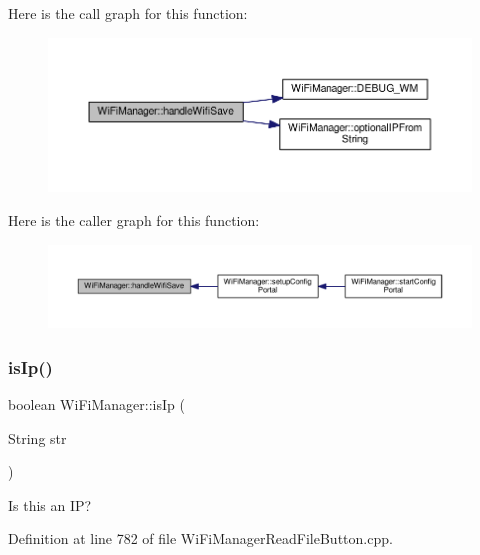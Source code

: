 Here is the call graph for this function\+:\nopagebreak
\begin{figure}[H]
\begin{center}
\leavevmode
\includegraphics[width=350pt]{d4/dc8/class_wi_fi_manager_a2a8c2b60aa86dfdeab8a1a90f7122dc7_cgraph}
\end{center}
\end{figure}
Here is the caller graph for this function\+:\nopagebreak
\begin{figure}[H]
\begin{center}
\leavevmode
\includegraphics[width=350pt]{d4/dc8/class_wi_fi_manager_a2a8c2b60aa86dfdeab8a1a90f7122dc7_icgraph}
\end{center}
\end{figure}
\mbox{\label{class_wi_fi_manager_a9c78a8774f746ec22a99d03a53baa607}} 
\subsubsection{\texorpdfstring{is\+Ip()}{isIp()}}
{\footnotesize\ttfamily boolean Wi\+Fi\+Manager\+::is\+Ip (\begin{DoxyParamCaption}\item[{String}]{str }\end{DoxyParamCaption})\hspace{0.3cm}{\ttfamily [private]}}

Is this an IP? 

Definition at line 782 of file Wi\+Fi\+Manager\+Read\+File\+Button.\+cpp.



